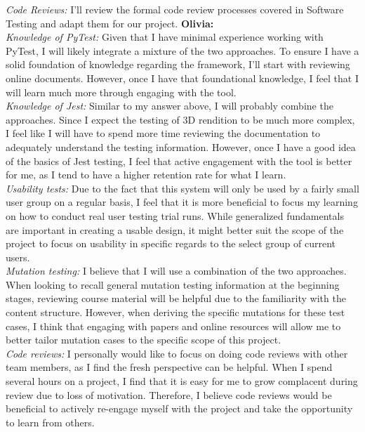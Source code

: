 \documentclass[12pt, titlepage]{article}
\begin{document}
\begin{enumerate}
  \textit{Code Reviews:} I'll review the formal code review processes covered in Software Testing and adapt them for our project. 
  \newline
  \textbf{Olivia: }\\
  \textit{Knowledge of PyTest:} Given that I have minimal experience working with PyTest, I will likely integrate a mixture of the two approaches. To ensure I have a solid foundation of knowledge regarding the framework, I’ll start with reviewing online documents. However, once I have that foundational knowledge, I feel that I will learn much more through engaging with the tool.\\
  \textit{Knowledge of Jest:} Similar to my answer above, I will probably combine the approaches. Since I expect the testing of 3D rendition to be much more complex, I feel like I will have to spend more time reviewing the documentation to adequately understand the testing information. However, once I have a good idea of the basics of Jest testing, I feel that active engagement with the tool is better for me, as I tend to have a higher retention rate for what I learn.\\
  \textit{Usability tests:} Due to the fact that this system will only be used by a fairly small user group on a regular basis, I feel that it is more beneficial to focus my learning on how to conduct real user testing trial runs. While generalized fundamentals are important in creating a usable design, it might better suit the scope of the project to focus on usability in specific regards to the select group of current users.\\
  \textit{Mutation testing:} I believe that I will use a combination of the two approaches. When looking to recall general mutation testing information at the beginning stages, reviewing course material will be helpful due to the familiarity with the content structure. However, when deriving the specific mutations for these test cases, I think that engaging with papers and online resources will allow me to better tailor mutation cases to the specific scope of this project.\\
  \textit{Code reviews:} I personally would like to focus on doing code reviews with other team members, as I find the fresh perspective can be helpful. When I spend several hours on a project, I find that it is easy for me to grow complacent during review due to loss of motivation. Therefore, I believe code reviews would be beneficial to actively re-engage myself with the project and take the opportunity to learn from others.


\end{enumerate}
\end{document}
